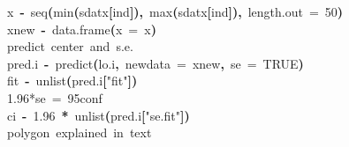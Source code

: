 \documentclass[a4paper]{article}
\newcommand{\hlnumber}[1]{\textcolor[rgb]{0.0823529411764706,0.0784313725490196,0.709803921568627}{#1}}%
\newcommand{\hlfunctioncall}[1]{\textcolor[rgb]{1,0,0}{#1}}%
\newcommand{\hlstring}[1]{\textcolor[rgb]{0.6,0.6,1}{#1}}%
\newcommand{\hlkeyword}[1]{\textcolor[rgb]{0,0,0}{\textbf{#1}}}%
\newcommand{\hlargument}[1]{\textcolor[rgb]{0.694117647058824,0.247058823529412,0.0196078431372549}{#1}}%
\newcommand{\hlcomment}[1]{\textcolor[rgb]{0.8,0.8,0.8}{#1}}%
\newcommand{\hlassignement}[1]{\textcolor[rgb]{0.215686274509804,0.215686274509804,0.384313725490196}{\textbf{#1}}}%
\newcommand{\hlsymbol}[1]{\textcolor[rgb]{0,0,0}{#1}}%
\newcommand{\hlprompt}[1]{\textcolor[rgb]{0,0,0}{#1}}%
\newcommand{\hlstd}[1]{\textcolor[rgb]{0,0,0}{#1}}%
\newenvironment{Houtput}{\raggedright}{%
%
}
\begin{document}
\begin{Houtput}
\hlstd{}\hlprompt{{\ }}{\ }{\ }{\ }{\ }\hlsymbol{x}{\ }\hlassignement{\usebox{\hlnormalsizeboxlessthan}-}{\ }\hlfunctioncall{seq}\hlkeyword{(}\hlfunctioncall{min}\hlkeyword{(}\hlsymbol{sdat}\hlkeyword{\usebox{\hlnormalsizeboxdollar}}\hlsymbol{x}\hlkeyword{[}\hlsymbol{ind}\hlkeyword{]}\hlkeyword{)}\hlkeyword{,}{\ }\hlfunctioncall{max}\hlkeyword{(}\hlsymbol{sdat}\hlkeyword{\usebox{\hlnormalsizeboxdollar}}\hlsymbol{x}\hlkeyword{[}\hlsymbol{ind}\hlkeyword{]}\hlkeyword{)}\hlkeyword{,}{\ }\hlargument{length.out}{\ }\hlargument{=}{\ }\hlnumber{50}\hlkeyword{)}\hspace*{\fill}\\
\hlstd{}\hlprompt{{\ }}{\ }{\ }{\ }{\ }\hlsymbol{xnew}{\ }\hlassignement{\usebox{\hlnormalsizeboxlessthan}-}{\ }\hlfunctioncall{data.frame}\hlkeyword{(}\hlargument{x}{\ }\hlargument{=}{\ }\hlsymbol{x}\hlkeyword{)}\hspace*{\fill}\\
\hlstd{}\hlprompt{{\ }}{\ }{\ }{\ }{\ }\hlcomment{\usebox{\hlnormalsizeboxhash}{\ }predict{\ }center{\ }and{\ }s.e.}\hspace*{\fill}\\
\hlstd{}\hlprompt{{\ }}{\ }{\ }{\ }{\ }\hlsymbol{pred.i}{\ }\hlassignement{\usebox{\hlnormalsizeboxlessthan}-}{\ }\hlfunctioncall{predict}\hlkeyword{(}\hlsymbol{lo.i}\hlkeyword{,}{\ }\hlargument{newdata}{\ }\hlargument{=}{\ }\hlsymbol{xnew}\hlkeyword{,}{\ }\hlargument{se}{\ }\hlargument{=}{\ }\hlnumber{TRUE}\hlkeyword{)}\hspace*{\fill}\\
\hlstd{}\hlprompt{{\ }}{\ }{\ }{\ }{\ }\hlsymbol{fit}{\ }\hlassignement{\usebox{\hlnormalsizeboxlessthan}-}{\ }\hlfunctioncall{unlist}\hlkeyword{(}\hlsymbol{pred.i}\hlkeyword{[}\hlstring{"fit"}\hlkeyword{]}\hlkeyword{)}\hspace*{\fill}\\
\hlstd{}\hlprompt{{\ }}{\ }{\ }{\ }{\ }\hlcomment{\usebox{\hlnormalsizeboxhash}{\ }1.96*se{\ }={\ }95\usebox{\hlnormalsizeboxpercent}{\ }conf}\hspace*{\fill}\\
\hlstd{}\hlprompt{{\ }}{\ }{\ }{\ }{\ }\hlsymbol{ci}{\ }\hlassignement{\usebox{\hlnormalsizeboxlessthan}-}{\ }\hlnumber{1.96}{\ }\hlkeyword{*}{\ }\hlfunctioncall{unlist}\hlkeyword{(}\hlsymbol{pred.i}\hlkeyword{[}\hlstring{"se.fit"}\hlkeyword{]}\hlkeyword{)}\hspace*{\fill}\\
\hlstd{}\hlprompt{{\ }}{\ }{\ }{\ }{\ }\hlcomment{\usebox{\hlnormalsizeboxhash}{\ }polygon{\ }explained{\ }in{\ }text}\hspace*{\fill}\\

\end{Houtput}
\end{document}
